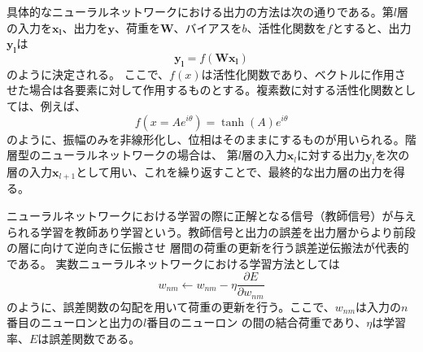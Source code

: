 \documentclass[11pt,a4paper,uplatex]{ujarticle}
\begin{document}
    具体的なニューラルネットワークにおける出力の方法は次の通りである。第$l$層の入力を$\bm{x_l}$、出力を$\bm{y}$、荷重を$\bm{W}$、バイアスを$b$、活性化関数を$f$とすると、出力$\bm{y_l}$は
    \begin{equation}
      \bm{y_l} = f(\bm{W}\bm{x_l})
    \end{equation}
    のように決定される。
    ここで、$f(x)$は活性化関数であり、ベクトルに作用させた場合は各要素に対して作用するものとする。複素数に対する活性化関数としては、例えば、
    \begin{equation}\label{activation_function}
      f(x = Ae^{i\theta}) = \tanh(A)e^{i\theta}
    \end{equation}
    のように、振幅のみを非線形化し、位相はそのままにするものが用いられる。階層型のニューラルネットワークの場合は、
    第$l$層の入力$\bm{x}_l$に対する出力$\bm{y}_l$を次の層の入力$\bm{x}_{l+1}$として用い、これを繰り返すことで、最終的な出力層の出力を得る。

    ニューラルネットワークにおける学習の際に正解となる信号（教師信号）が与えられる学習を教師あり学習という。教師信号と出力の誤差を出力層からより前段の層に向けて逆向きに伝搬させ
    層間の荷重の更新を行う誤差逆伝搬法が代表的である。
    実数ニューラルネットワークにおける学習方法としては
    \begin{equation}
      w_{nm} \leftarrow w_{nm} - \eta \frac{\partial E}{\partial w_{nm}}
    \end{equation}
    のように、誤差関数の勾配を用いて荷重の更新を行う。ここで、$w_{nm}$は入力の$n$番目のニューロンと出力の$l$番目のニューロン
    の間の結合荷重であり、$\eta$は学習率、$E$は誤差関数である。
\end{document}
